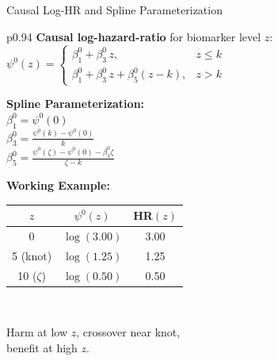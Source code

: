 \documentclass[
  ignorenonframetext,
  aspectratio=169]{beamer}
\begin{document}
\begin{frame}{Causal Log-HR and Spline Parameterization}
\label{causal-log-hr-and-spline-parameterization}
\vspace{6pt}

\begin{center}
\small
\renewcommand{\arraystretch}{1.3}
\begin{tabular}{p{}}
\hline
\textbf{Causal log-hazard-ratio} for biomarker level $z$: \\[4pt]
$\displaystyle \psi^{0}(z) = \begin{cases} \beta_{1}^{0} + \beta_{3}^{0}\, z, & z \leq k \\[4pt] \beta_{1}^{0} + \beta_{3}^{0}\, z + \beta_{5}^{0}(z-k), & z > k \end{cases}$ \\[6pt]
\hline
\begin{minipage}[t]{0.48\textwidth}
\vspace{4pt}
\textbf{Spline Parameterization:} \\[4pt]
$\displaystyle \beta_{1}^{0} = \psi^{0}(0)$ \\[6pt]
$\displaystyle \beta_{3}^{0} = \frac{\psi^{0}(k) - \psi^{0}(0)}{k}$ \\[6pt]
$\displaystyle \beta_{5}^{0} = \frac{\psi^{0}(\zeta) - \psi^{0}(0) - \beta_{3}^{0}\zeta}{\zeta - k}$
\vspace{4pt}
\end{minipage}
\hfill
\begin{minipage}[t]{0.44\textwidth}
\vspace{4pt}
\textbf{Working Example:} \\[4pt]
\centering
\begin{tabular}{ccc}
$z$ & $\psi^{0}(z)$ & HR$(z)$ \\
\hline
0            & $\log(3.00)$  & 3.00 \\
5 (knot)     & $\log(1.25)$  & 1.25 \\
10 ($\zeta$) & $\log(0.50)$  & 0.50 \\
\end{tabular}
\\[8pt]
\raggedright
Harm at low $z$, crossover near knot, \\
benefit at high $z$.
\vspace{4pt}
\end{minipage} \\
\hline
\end{tabular}
\end{center}
\end{frame}
\end{document}
